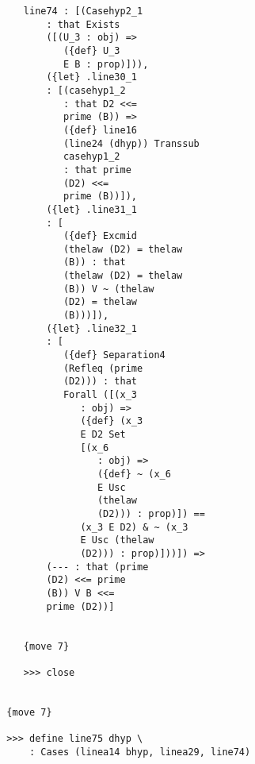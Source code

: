 \documentclass[12pt]{article}
\begin{document}
\begin{verbatim}
                        line74 : [(Casehyp2_1 
                            : that Exists 
                            ([(U_3 : obj) => 
                               ({def} U_3 
                               E B : prop)])), 
                            ({let} .line30_1 
                            : [(casehyp1_2 
                               : that D2 <<= 
                               prime (B)) => 
                               ({def} line16 
                               (line24 (dhyp)) Transsub 
                               casehyp1_2 
                               : that prime 
                               (D2) <<= 
                               prime (B))]), 
                            ({let} .line31_1 
                            : [
                               ({def} Excmid 
                               (thelaw (D2) = thelaw 
                               (B)) : that 
                               (thelaw (D2) = thelaw 
                               (B)) V ~ (thelaw 
                               (D2) = thelaw 
                               (B)))]), 
                            ({let} .line32_1 
                            : [
                               ({def} Separation4 
                               (Refleq (prime 
                               (D2))) : that 
                               Forall ([(x_3 
                                  : obj) => 
                                  ({def} (x_3 
                                  E D2 Set 
                                  [(x_6 
                                     : obj) => 
                                     ({def} ~ (x_6 
                                     E Usc 
                                     (thelaw 
                                     (D2))) : prop)]) == 
                                  (x_3 E D2) & ~ (x_3 
                                  E Usc (thelaw 
                                  (D2))) : prop)]))]) => 
                            (--- : that (prime 
                            (D2) <<= prime 
                            (B)) V B <<= 
                            prime (D2))]


                        {move 7}

                        >>> close


                     {move 7}

                     >>> define line75 dhyp \
                         : Cases (linea14 bhyp, linea29, line74)



\end{verbatim}
\end{document}
